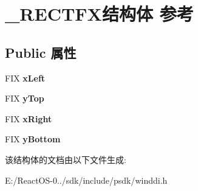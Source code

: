 \hypertarget{struct___r_e_c_t_f_x}{}\section{\+\_\+\+R\+E\+C\+T\+F\+X结构体 参考}
\label{struct___r_e_c_t_f_x}
\subsection*{Public 属性}
\begin{DoxyCompactItemize}
\item 
\mbox{\label{struct___r_e_c_t_f_x_a083b3704ba7d019b1985083ac0f99e20}} 
F\+IX {\bfseries x\+Left}
\item 
\mbox{\label{struct___r_e_c_t_f_x_a53f27d9dab7f387b6b85bc54ffce3593}} 
F\+IX {\bfseries y\+Top}
\item 
\mbox{\label{struct___r_e_c_t_f_x_a6ddf2972b6a1788485934bc1597ad6c7}} 
F\+IX {\bfseries x\+Right}
\item 
\mbox{\label{struct___r_e_c_t_f_x_a844b9847714185a88e6337d8ad6dc704}} 
F\+IX {\bfseries y\+Bottom}
\end{DoxyCompactItemize}


该结构体的文档由以下文件生成\+:\begin{DoxyCompactItemize}
\item 
E\+:/\+React\+O\+S-\/0../sdk/include/psdk/winddi.\+h\end{DoxyCompactItemize}
